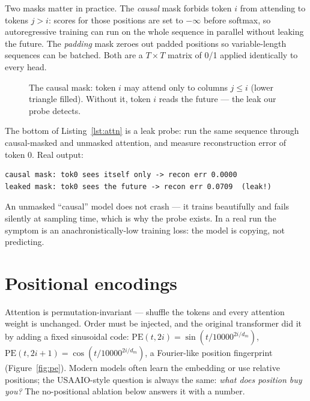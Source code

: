 Two masks matter in practice. The
\emph{causal} mask forbids token $i$ from attending to tokens $j>i$:
scores for those positions are set to $-\infty$ before softmax, so
autoregressive training can run on the whole sequence in parallel
without leaking the future. The \emph{padding} mask zeroes out
padded positions so variable-length sequences can be batched. Both
are a $T\times T$ matrix of 0/1 applied identically to every head.

\begin{figure}[htbp]
\centering
{}
\caption{The causal mask: token $i$ may attend only to columns
$j\le i$ (lower triangle filled). Without it, token $i$ reads the
future --- the leak our probe detects.}
\label{fig:causal}
\end{figure}

\begin{example}
\label{ex:maskleak}
The bottom of Listing~\ref{lst:attn} is a leak probe: run the same
sequence through causal-masked and unmasked attention, and measure
reconstruction error of token 0. Real output:
\begin{verbatim}
causal mask: tok0 sees itself only -> recon err 0.0000
leaked mask: tok0 sees the future -> recon err 0.0709  (leak!)
\end{verbatim}
An unmasked ``causal'' model does not crash --- it trains beautifully
and fails silently at sampling time, which is why the probe exists.
In a real run the symptom is an anachronistically-low training loss:
the model is copying, not predicting.
\end{example}

\section{Positional encodings}
\label{sec:pos}

Attention is permutation-invariant --- shuffle the tokens and every
attention weight is unchanged. Order must be injected, and the
original transformer did it by adding a fixed sinusoidal code:
$\mathrm{PE}(t,2i)=\sin(t/10000^{2i/d_m})$,
$\mathrm{PE}(t,2i+1)=\cos(t/10000^{2i/d_m})$, a Fourier-like position
fingerprint (Figure~\ref{fig:pe}). Modern models often learn the
embedding or use relative positions; the USAAIO-style question is
always the same: \emph{what does position buy you?} The no-positional
ablation below answers it with a number.

